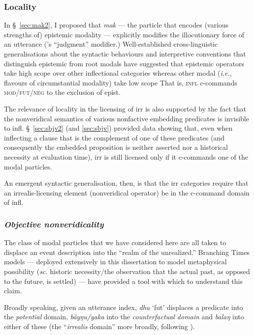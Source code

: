 \subsubsection{Locality} In \S~\ref{sec:mak2}, I proposed that \textit{mak} --- the particle that encodes (various strengths of) epistemic modality --- explicitly modifies the illocutionary force of an utterance (\citealp{Krifka2021}'s ``judgment'' modifier.) Well-established cross-linguistic generalisations about the syntactic behaviours and interpretive conventions that distinguish epistemic from root modals have suggested that epistemic operators take high scope over other inflectional categories whereas other modal (\textit{i.e.}, flavours of circumstantial modality) take low scope \citetext{\textit{e.g.}, \citealp{Hacquard2010} and references therein.} That is, \textsc{infl} c-commands \textsc{mod/fut/neg} to the exclusion of \gls{epist}.

The relevance of locality in the licensing of \gls{irr} is also supported by the fact that the nonveridical semantics of various nonfactive embedding predicates is invisible to \gls{infl}. \S~\ref{sec:sbjv2} (and \ref{sec:sbjv}) provided data showing that, even when inflecting a clause that is the complement of one of these predicates (and consequently the embedded proposition is neither asserted nor a historical necessity at evaluation time), \gls{irr} is still licensed only if it c-commands one of the modal particles.

An emergent syntactic generalisation, then, is that the \gls{irr} categories require that an irrealis-licensing element (nonveridical operator) be in the c-command domain of \gls{infl}.

\subsubsection[Objective nonveridicality]{\textit{Objective nonveridicality}}


The class of modal particles that we have considered here are all taken to displace an event description into the ``realm of the unrealized.'' Branching Times models --- deployed extensively in this dissertation to model metaphysical possibility (\textit{sc.} historic necessity/the observation that the actual past, as opposed to the future, is settled) --- have provided a tool with which to understand this claim.

Broadly speaking, given an utterance index, \textit{dhu} `\gls{fut}' displaces a predicate into the \textsl{potential} domain, \textit{bäyŋu/yaka} into the \textsl{counterfactual domain} and \textit{balaŋ} into either of these (the ``\textsl{irrealis} domain'' more broadly, following \citealp{VonPrincea}).

